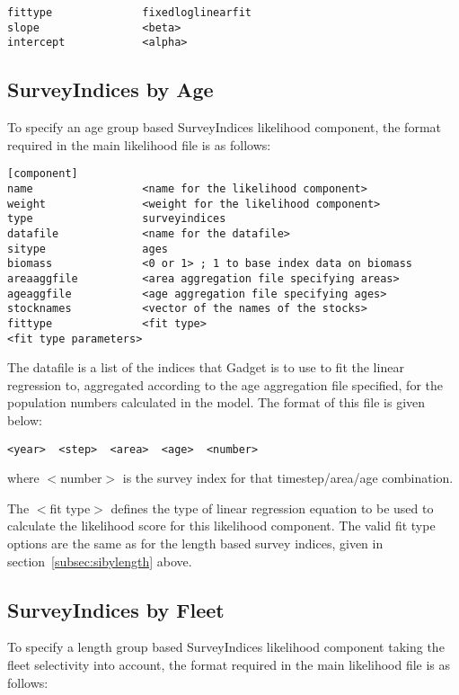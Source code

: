 \documentclass[10pt,twoside]{book}
\begin{document}
{\small\begin{verbatim}
fittype              fixedloglinearfit
slope                <beta>
intercept            <alpha>
\end{verbatim}}

\subsection{SurveyIndices by Age}\label{subsec:sibyage}
To specify an age group based SurveyIndices likelihood component, the format required in the main likelihood file is as follows:

{\small\begin{verbatim}
[component]
name                 <name for the likelihood component>
weight               <weight for the likelihood component>
type                 surveyindices
datafile             <name for the datafile>
sitype               ages
biomass              <0 or 1> ; 1 to base index data on biomass
areaaggfile          <area aggregation file specifying areas>
ageaggfile           <age aggregation file specifying ages>
stocknames           <vector of the names of the stocks>
fittype              <fit type>
<fit type parameters>
\end{verbatim}}

The datafile is a list of the indices that Gadget is to use to fit the linear regression to, aggregated according to the age aggregation file specified, for the population numbers calculated in the model.  The format of this file is given below:

{\small\begin{verbatim}
<year>  <step>  <area>  <age>  <number>
\end{verbatim}}

where $<$number$>$ is the survey index for that timestep/area/age combination.

\bigskip
The $<$fit type$>$ defines the type of linear regression equation to be used to calculate the likelihood score for this likelihood component.  The valid fit type options are the same as for the length based survey indices, given in section~\ref{subsec:sibylength} above.

\subsection{SurveyIndices by Fleet}\label{subsec:sibyfleet}
To specify a length group based SurveyIndices likelihood component taking the fleet selectivity into account, the format required in the main likelihood file is as follows:
\end{document}
